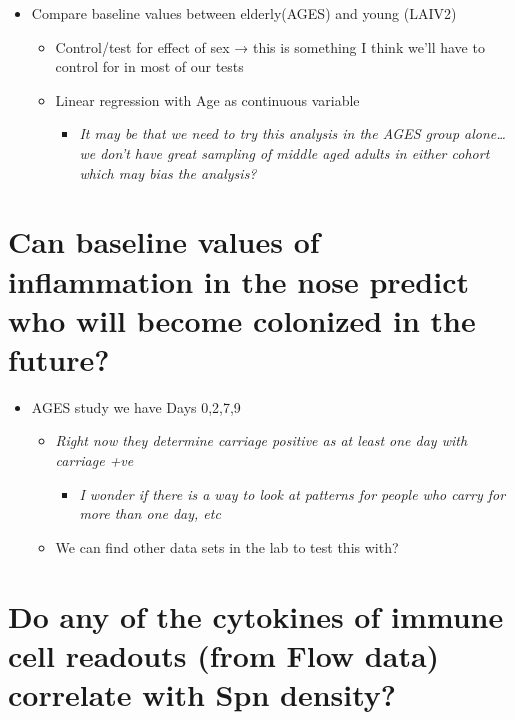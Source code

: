 \documentclass[
]{book}
\providecommand{\tightlist}{%
  \setlength{\itemsep}{0pt}\setlength{\parskip}{0pt}}
\begin{document}
\begin{itemize}
\item
  Compare baseline values between elderly(AGES) and young (LAIV2)

  \begin{itemize}
  \item
    Control/test for effect of sex → this is something I think we'll have to control for in most of our tests
  \item
    Linear regression with Age as continuous variable

    \begin{itemize}
    \tightlist
    \item
      \emph{It may be that we need to try this analysis in the AGES group alone\ldots we don't have great sampling of middle aged adults in either cohort which may bias the analysis?}
    \end{itemize}
  \end{itemize}
\end{itemize}

\hypertarget{can-baseline-values-of-inflammation-in-the-nose-predict-who-will-become-colonized-in-the-future}{%
\section{Can baseline values of inflammation in the nose predict who will become colonized in the future?}\label{can-baseline-values-of-inflammation-in-the-nose-predict-who-will-become-colonized-in-the-future}}

\begin{itemize}
\item
  AGES study we have Days 0,2,7,9

  \begin{itemize}
  \item
    \emph{Right now they determine carriage positive as at least one day with carriage +ve}

    \begin{itemize}
    \tightlist
    \item
      \emph{I wonder if there is a way to look at patterns for people who carry for more than one day, etc}
    \end{itemize}
  \item
    We can find other data sets in the lab to test this with?
  \end{itemize}
\end{itemize}

\hypertarget{do-any-of-the-cytokines-of-immune-cell-readouts-from-flow-data-correlate-with-spn-density}{%
\section{Do any of the cytokines of immune cell readouts (from Flow data) correlate with Spn density?}\label{do-any-of-the-cytokines-of-immune-cell-readouts-from-flow-data-correlate-with-spn-density}}
\end{document}
